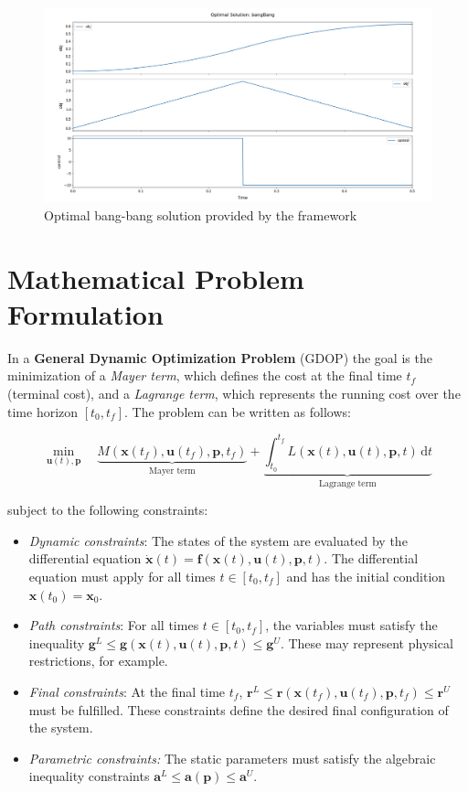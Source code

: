 \documentclass[12pt]{article}
\newcommand{\dd}{\mathrm{d}}
\renewcommand{\v}{\bm}
\begin{document}
\begin{figure}[H]
	\centering
	\includegraphics[width=\textwidth]{images/bangBang.png}
	\caption{Optimal bang-bang solution provided by the framework}
	\label{fig:bangBang}
\end{figure}
\section{Mathematical Problem Formulation}
\label{c:GDOP}

In a \textbf{General Dynamic Optimization Problem} (GDOP) the goal is the
minimization of a \textit{Mayer term}, which defines the cost at the final time
$t_f$ (terminal cost), and a \textit{Lagrange term}, which represents the
running cost over the time horizon $[t_0, t_f]$. The problem can be written as
follows:

\begin{equation*}
	\min_{\v{u}(t), \v{p}} \quad \underbrace{M(\v{x}(t_f), \v{u}(t_f),
		\v{p}, t_f)}_{\text{Mayer term}} + \underbrace{\int_{t_0}^{t_f} L(\v{x}(t),
		\v{u}(t), \v{p}, t)\, \dd t}_{\text{Lagrange term}}
\end{equation*}

subject to the following constraints:

\begin{itemize}
	\item \textit{Dynamic constraints}:
	      The states of the system are evaluated by the differential equation
	      $\dot{\v{x}}(t) = \v{f}(\v{x}(t), \v{u}(t), \v{p}, t)$. The differential
	      equation must apply for all times $t \in [t_0, t_f]$ and has the initial
	      condition $\v{x}(t_0) = \v{x}_0$.

	\item \textit{Path constraints}:
	      For all times $t \in [t_0, t_f]$, the variables must satisfy the
	      inequality $\v{g}^L \leq \v{g}(\v{x}(t), \v{u}(t), \v{p}, t) \leq \v{g}^U$.
	      These may represent physical restrictions, for example.

	\item \textit{Final constraints}:
	      At the final time $t_f$, $\v{r}^L \leq \v{r}(\v{x}(t_f), \v{u}(t_f),
		      \v{p}, t_f) \leq \v{r}^U$ must be fulfilled. These constraints define the
	      desired final configuration of the system.

	\item \textit{Parametric constraints:}
	      The static parameters must satisfy the algebraic inequality constraints
	      $\v{a}^L \leq \v{a}(\v{p}) \leq \v{a}^U$.
\end{itemize}
\end{document}
